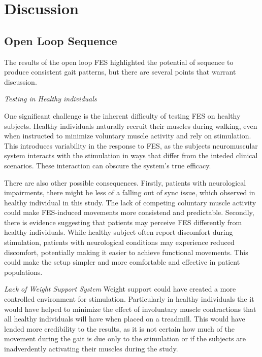 

\section{Discussion}
\subsection{Open Loop Sequence}
The results of the open loop FES highlighted the potential of sequence to produce consistent gait patterns, but there are several points that warrant discussion.
\newline

\textit{Testing in Healthy individuals}

One significant challenge is the inherent difficulty of testing FES on healthy subjects. Healthy individuals naturally recruit their muscles during walking, even when instructed to minimize voluntary muscle activity and rely on stimulation. This introduces variability in the response to FES, as the subjects neuromuscular system interacts with the stimulation in ways that differ from the inteded clinical scenarios. These interaction can obscure the system's true efficacy.

There are also other possible consequences. Firstly, patients with neurological impairments, there might be less of a falling out of sync issue, which observed in healthy individual in this study. The lack of competing coluntary muscle activity could make FES-induced movements more consistend and predictable. Secondly, there is evidence suggesting that patients may perceive FES differently from healthy individuals. While healthy subject often report discomfort during stimulation, patients with neurological conditions may experience reduced discomfort, potentially making it easier to achieve functional movements. This could make the setup simpler and more comfortable and effective in patient populations. 


\textit{Lack of Weight Support System}
Weight support could have created a more controlled environment for stimulation. Particularly in healthy individuals the it would have helped to minimize the effect of involuntary muscle contractions that all healthy individuals will have when placed on a treadmill. This would have lended more credibility to the results, as it is not certain how much of the movement during the gait is due only to the stimulation or if the subjects are inadverdently activating their muscles during the study.
\newline 

